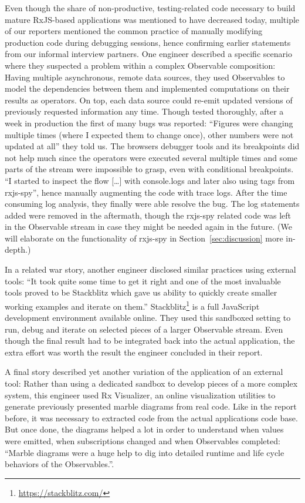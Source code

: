 \documentclass[12pt,a4paper]{article}
\begin{document}
Even though the share of non-productive, testing-related code necessary to build mature RxJS-based applications was mentioned to have decreased today, multiple of our reporters mentioned the common practice of manually modifying production code during debugging sessions, hence confirming earlier statements from our informal interview partners. One engineer described a specific scenario where they suspected a problem within a complex Observable composition: Having multiple asynchronous, remote data sources, they used Observables to model the dependencies between them and implemented computations on their results as operators. On top, each data source could re-emit updated versions of previously requested information any time. Though tested thoroughly, after a week in production the first of many bugs was reported: ``Figures were changing multiple times (where I expected them to change once), other numbers were not updated at all'' they told us. The browsers debugger tools and its breakpoints did not help much since the operators were executed several multiple times and some parts of the stream were impossible to grasp, even with conditional breakpoints. ``I started to inspect the flow [\dots] with console.logs and later also using tags from rxjs-spy'', hence manually augmenting the code with trace logs. After the time consuming log analysis, they finally were able resolve the bug. The log statements added were removed in the aftermath, though the rxjs-spy related code was left in the Observable stream in case they might be needed again in the future. (We will elaborate on the functionality of rxjs-spy in Section~\ref{sec:discussion} more in-depth.)

In a related war story, another engineer disclosed similar practices using  external tools: ``It took quite some time to get it right and one of the most invaluable tools proved to be Stackblitz which gave us ability to quickly create smaller working examples and iterate on them.'' Stackblitz\footnote{\url{https://stackblitz.com/}} is a full JavaScript development environment available online. They used this sandboxed setting to run, debug and iterate on selected pieces of a larger Observable stream. Even though the final result had to be integrated back into the actual application, the extra effort was worth the result the engineer concluded in their report.

A final story described yet another variation of the application of an external tool: Rather than using a dedicated sandbox to develop pieces of a more complex system, this engineer used Rx Visualizer, an online visualization utilities to generate previously presented marble diagrams from real code. Like in the report before, it was necessary to extracted code from the actual applications code base. But once done, the diagrams helped a lot in order to understand when values were emitted, when subscriptions changed and when Observables completed: ``Marble diagrams were a huge help to dig into detailed runtime and life cycle behaviors of the Observables.''.
\end{document}
